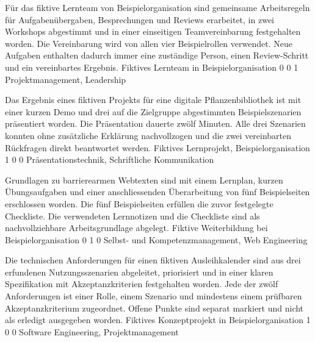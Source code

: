 
  {Für das fiktive Lernteam von Beispielorganisation sind gemeinsame Arbeitsregeln für Aufgabenübergaben, Besprechungen und Reviews erarbeitet, in zwei Workshops abgestimmt und in einer einseitigen Teamvereinbarung festgehalten worden.}
  {Die Vereinbarung wird von allen vier Beispielrollen verwendet. Neue Aufgaben enthalten dadurch immer eine zuständige Person, einen Review-Schritt und ein vereinbartes Ergebnis.}
  {Fiktives Lernteam in Beispielorganisation}
  {0}
  {0}
  {1}
  {Projektmanagement, Leadership}

  {Das Ergebnis eines fiktiven Projekts für eine digitale Pflanzenbibliothek ist mit einer kurzen Demo und drei auf die Zielgruppe abgestimmten Beispielszenarien präsentiert worden.}
  {Die Präsentation dauerte zwölf Minuten. Alle drei Szenarien konnten ohne zusätzliche Erklärung nachvollzogen und die zwei vereinbarten Rückfragen direkt beantwortet werden.}
  {Fiktives Lernprojekt, Beispielorganisation}
  {1}
  {0}
  {0}
  {Präsentationstechnik, Schriftliche Kommunikation}

  {Grundlagen zu barrierearmen Webtexten sind mit einem Lernplan, kurzen Übungsaufgaben und einer anschliessenden Überarbeitung von fünf Beispielseiten erschlossen worden.}
  {Die fünf Beispielseiten erfüllen die zuvor festgelegte Checkliste. Die verwendeten Lernnotizen und die Checkliste sind als nachvollziehbare Arbeitsgrundlage abgelegt.}
  {Fiktive Weiterbildung bei Beispielorganisation}
  {0}
  {1}
  {0}
  {Selbst- und Kompetenzmanagement, Web Engineering}

  {Die technischen Anforderungen für einen fiktiven Ausleihkalender sind aus drei erfundenen Nutzungsszenarien abgeleitet, priorisiert und in einer klaren Spezifikation mit Akzeptanzkriterien festgehalten worden.}
  {Jede der zwölf Anforderungen ist einer Rolle, einem Szenario und mindestens einem prüfbaren Akzeptanzkriterium zugeordnet. Offene Punkte sind separat markiert und nicht als erledigt ausgegeben worden.}
  {Fiktives Konzeptprojekt in Beispielorganisation}
  {1}
  {0}
  {0}
  {Software Engineering, Projektmanagement}
